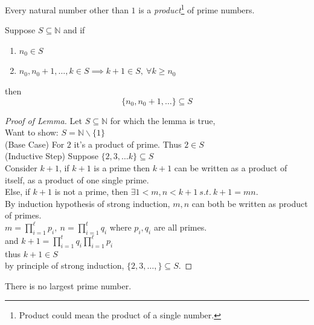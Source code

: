 \documentclass[10pt]{article}
\begin{document}
	\begin{lemma}
		Every natural number other than $1$ is a \emph{product}\footnote{Product could mean the product of a single number.} of prime numbers.
	\end{lemma}
	
	\begin{theorem}
		Suppose $S \subseteq \mathbb{N}$ and if 
		\begin{enumerate}
			\item $n_0 \in S$
			\item $n_0, n_0 + 1, \dots, k \in S \implies k+1 \in S,\ \forall k \geq n_0$
		\end{enumerate}
		then 
		\[
			\{n_0, n_0 + 1, \dots\} \subseteq S
		\]
	\end{theorem}
	\begin{proof} [Proof of Lemma]
		Let $S \subseteq \mathbb{N}$ for which the lemma is true, \\
		Want to show: $S = \mathbb{N} \backslash \{1\}$ \\
		(Base Case) For $2$ it's a product of prime. Thus $2 \in S$ \\
		(Inductive Step) Suppose $\{2,3, \dots k\} \subseteq S$ \\
		Consider $k+1$, if $k+1$ is a prime then $k+1$ can be written as a product of itself, as a product of one single prime.\\
		Else, if $k+1$ is not a prime, then $\exists 1<m,n<k+1\ s.t.\ k+1 = mn$.\\
		By induction hypothesis of strong induction, $m,n$ can both be written as product of primes. \\
		$m = \prod_{i=1}^\ell {p_i},\ n = \prod_{i=1}^t {q_i}$ where $p_i, q_i$ are all primes.\\
		and $k+1 = \prod_{i=1}^t{q_i}\prod_{i=1}^\ell {p_i}$ \\
		thus $k+1 \in S$ \\ 
		by principle of strong induction, $\{2,3,\dots,\} \subseteq S$.
	\end{proof}
	
	\begin{theorem}
		There is no largest prime number.
	\end{theorem}
	
\end{document}
